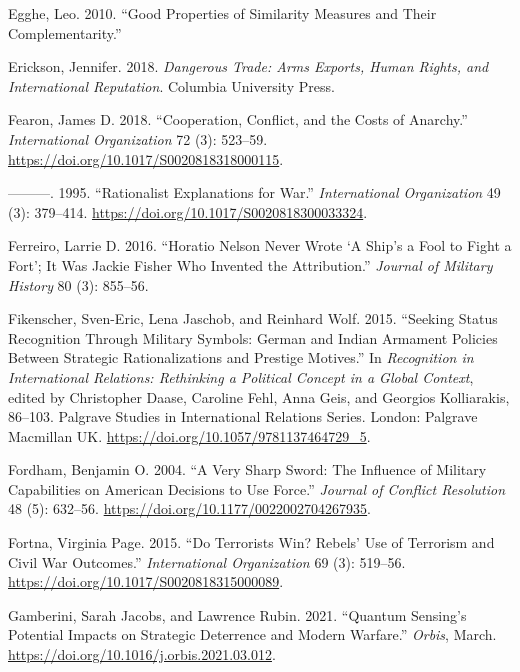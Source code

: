 \documentclass[
]{article}
\begin{document}
\leavevmode\hypertarget{ref-egghe_goodpropertiessimilarity_2010}{}%
Egghe, Leo. 2010. ``Good Properties of Similarity Measures and Their Complementarity.''

\leavevmode\hypertarget{ref-erickson_dangeroustradearms_2018}{}%
Erickson, Jennifer. 2018. \emph{Dangerous Trade: Arms Exports, Human Rights, and International Reputation}. Columbia University Press.

\leavevmode\hypertarget{ref-fearon_cooperationconflictcosts_2018}{}%
Fearon, James D. 2018. ``Cooperation, Conflict, and the Costs of Anarchy.'' \emph{International Organization} 72 (3): 523--59. \url{https://doi.org/10.1017/S0020818318000115}.

\leavevmode\hypertarget{ref-fearon_rationalistexplanationswar_1995}{}%
---------. 1995. ``Rationalist Explanations for War.'' \emph{International Organization} 49 (3): 379--414. \url{https://doi.org/10.1017/S0020818300033324}.

\leavevmode\hypertarget{ref-ferreiro_horationelsonnever_2016}{}%
Ferreiro, Larrie D. 2016. ``Horatio Nelson Never Wrote `A Ship's a Fool to Fight a Fort'; It Was Jackie Fisher Who Invented the Attribution.'' \emph{Journal of Military History} 80 (3): 855--56.

\leavevmode\hypertarget{ref-fikenscher_seekingstatusrecognition_2015}{}%
Fikenscher, Sven-Eric, Lena Jaschob, and Reinhard Wolf. 2015. ``Seeking Status Recognition Through Military Symbols: German and Indian Armament Policies Between Strategic Rationalizations and Prestige Motives.'' In \emph{Recognition in International Relations: Rethinking a Political Concept in a Global Context}, edited by Christopher Daase, Caroline Fehl, Anna Geis, and Georgios Kolliarakis, 86--103. Palgrave Studies in International Relations Series. London: Palgrave Macmillan UK. \url{https://doi.org/10.1057/9781137464729_5}.

\leavevmode\hypertarget{ref-fordham_verysharpsword_2004}{}%
Fordham, Benjamin O. 2004. ``A Very Sharp Sword: The Influence of Military Capabilities on American Decisions to Use Force.'' \emph{Journal of Conflict Resolution} 48 (5): 632--56. \url{https://doi.org/10.1177/0022002704267935}.

\leavevmode\hypertarget{ref-fortna_terroristswinrebels_2015}{}%
Fortna, Virginia Page. 2015. ``Do Terrorists Win? Rebels' Use of Terrorism and Civil War Outcomes.'' \emph{International Organization} 69 (3): 519--56. \url{https://doi.org/10.1017/S0020818315000089}.

\leavevmode\hypertarget{ref-gamberini_quantumsensingpotential_2021}{}%
Gamberini, Sarah Jacobs, and Lawrence Rubin. 2021. ``Quantum Sensing's Potential Impacts on Strategic Deterrence and Modern Warfare.'' \emph{Orbis}, March. \url{https://doi.org/10.1016/j.orbis.2021.03.012}.
\end{document}
